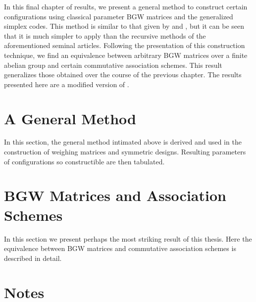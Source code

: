 \documentclass[../../main]{subfiles}
\begin{document}
In this final chapter of results, we present a general method
\cite[see][]{w-mat-construct} to construct certain configurations using
classical parameter BGW matrices and the generalized simplex codes. This method
is similar to that given by \cite{rajkundlia} and \cite{ionin-bgw-bibd}, but it
can be seen that it is much simpler to apply than the recursive methods of the
aforementioned seminal articles. Following the presentation of this construction
technique, we find an equivalence between arbitrary BGW matrices over a finite
abelian group and certain commutative association schemes. This result
generalizes those obtained over the course of the previous chapter. The results
presented here are a modified version of \cite{w-mat-construct}.

 \section{\centering A General Method}
 
 In this section, the general method intimated above is derived and used in the
 construction of weighing matrices and symmetric designs. Resulting parameters
 of configurations so constructible are then tabulated. 
 
 \dinkus
 
 
 
 \section{\centering BGW Matrices and Association Schemes}
 
 In this section we present perhaps the most striking result of this thesis. Here
 the equivalence between BGW matrices and commutative association schemes is
 described in detail. 
 
 \dinkus
 
 
 
 \singlespace
 
 \section*{\centering Notes}
 \thefnotes
 
 \doublespacing
 
 \biblio
\end{document}
